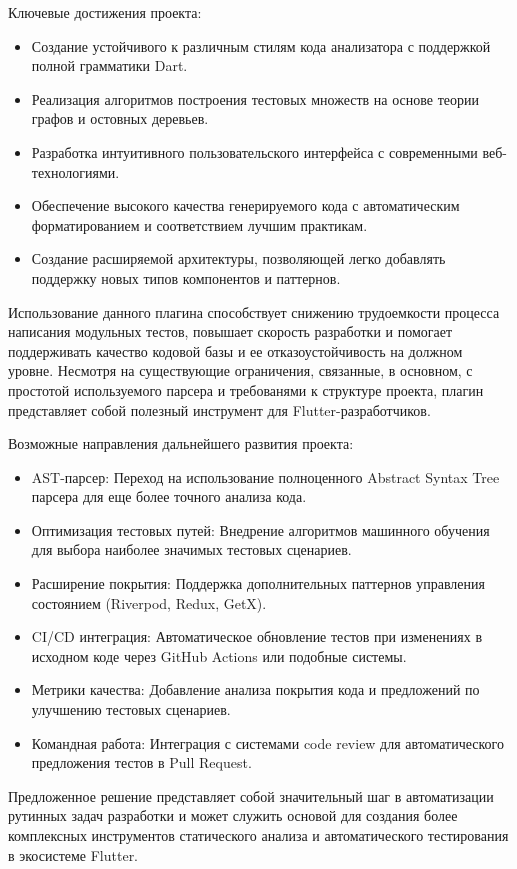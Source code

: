 \documentclass[14pt, russian]{scrartcl}
\begin{document}
Ключевые достижения проекта:
\begin{itemize}
    \item Создание устойчивого к различным стилям кода анализатора с поддержкой полной грамматики Dart.
    \item Реализация алгоритмов построения тестовых множеств на основе теории графов и остовных деревьев.
    \item Разработка интуитивного пользовательского интерфейса с современными веб-технологиями.
    \item Обеспечение высокого качества генерируемого кода с автоматическим форматированием и соответствием лучшим практикам.
    \item Создание расширяемой архитектуры, позволяющей легко добавлять поддержку новых типов компонентов и паттернов.
\end{itemize}

Использование данного плагина способствует снижению трудоемкости процесса написания модульных тестов, повышает скорость разработки и помогает поддерживать качество кодовой базы и ее отказоустойчивость на должном уровне. Несмотря на существующие ограничения, связанные, в основном, с простотой используемого парсера и требованями к структуре проекта, плагин представляет собой полезный инструмент для Flutter-разработчиков.

Возможные направления дальнейшего развития проекта:
\begin{itemize}
    \item AST-парсер: Переход на использование полноценного Abstract Syntax Tree парсера для еще более точного анализа кода.
    \item Оптимизация тестовых путей: Внедрение алгоритмов машинного обучения для выбора наиболее значимых тестовых сценариев.
    \item Расширение покрытия: Поддержка дополнительных паттернов управления состоянием (Riverpod, Redux, GetX).
    \item CI/CD интеграция: Автоматическое обновление тестов при изменениях в исходном коде через GitHub Actions или подобные системы.
    \item Метрики качества: Добавление анализа покрытия кода и предложений по улучшению тестовых сценариев.
    \item Командная работа: Интеграция с системами code review для автоматического предложения тестов в Pull Request.
\end{itemize}

Предложенное решение представляет собой значительный шаг в автоматизации рутинных задач разработки и может служить основой для создания более комплексных инструментов статического анализа и автоматического тестирования в экосистеме Flutter.
\end{document}
